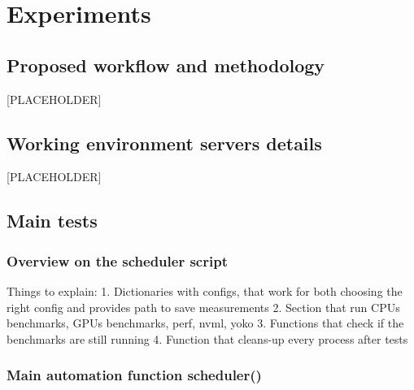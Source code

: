 \chapter{Experiments}

\section{Proposed workflow and methodology}

[PLACEHOLDER]


\section{Working environment \- servers details}

[PLACEHOLDER]

\section{Main tests}

\subsection{Overview on the scheduler script}

Things to explain:
1. Dictionaries with configs, that work for both choosing the right config and
provides path to save measurements
2. Section that run CPUs benchmarks, GPUs benchmarks, perf, nvml, yoko
3. Functions that check if the benchmarks are still running
4. Function that cleans-up every process after tests


\subsection{Main automation function \- scheduler()}


